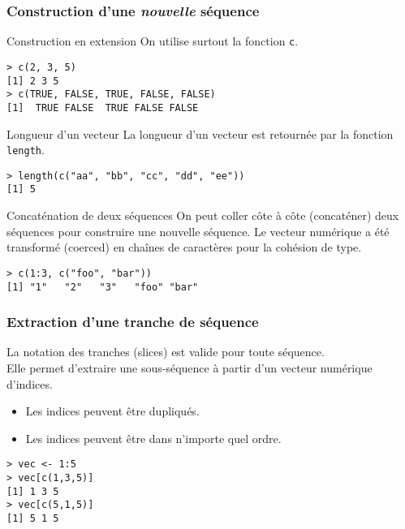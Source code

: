 \documentclass[10pt]{beamer}
\begin{document}
\begin{frame}[fragile]
  \frametitle{Construction d'une \emph{nouvelle} séquence}
  \begin{alertblock}{Construction en extension}
    On utilise surtout la fonction \alert{\texttt{c}}.
    \begin{lstlisting}
> c(2, 3, 5)
[1] 2 3 5
> c(TRUE, FALSE, TRUE, FALSE, FALSE)
[1]  TRUE FALSE  TRUE FALSE FALSE
\end{lstlisting}
  \end{alertblock}

  \begin{block}{Longueur d'un vecteur}
    La longueur d’un vecteur est retournée par la fonction \texttt{length}.
    \begin{lstlisting}
> length(c("aa", "bb", "cc", "dd", "ee"))
[1] 5      
    \end{lstlisting}
  \end{block}

  \begin{block}{Concaténation de deux séquences}
    On peut coller côte à côte (concaténer) deux séquences pour construire une nouvelle séquence.
    Le vecteur numérique a été transformé (\alert{coerced}) en chaînes de caractères pour la cohésion de type.
    \begin{lstlisting}
> c(1:3, c("foo", "bar"))
[1] "1"   "2"   "3"   "foo" "bar"      
\end{lstlisting}
  \end{block}
\end{frame}
\begin{frame}[fragile]
  \frametitle{Extraction d'une tranche de séquence}
La notation des tranches (\alert{slices}) est valide pour toute séquence. \\
Elle permet d’extraire une sous-séquence à partir d’un \alert{vecteur numérique d’indices}.
\begin{itemize}
\item Les indices peuvent être dupliqués.
\item Les indices peuvent être dans n'importe quel ordre.  
\end{itemize}
\begin{lstlisting}
> vec <- 1:5
> vec[c(1,3,5)]
[1] 1 3 5
> vec[c(5,1,5)]
[1] 5 1 5  
\end{lstlisting}
\end{frame}
\end{document}
